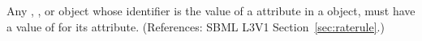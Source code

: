 Any \Compartment, \Species, \Parameter or \SpeciesReference object whose
identifier is the value of a  attribute in a \RateRule
object, must have a value of  for its 
attribute.  (References: SBML L3V1 Section~\ref{sec:raterule}.)
